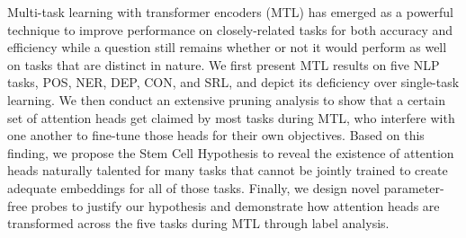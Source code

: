 Multi-task learning with transformer encoders (MTL) has emerged as a powerful technique to improve performance on closely-related tasks for both accuracy and efficiency while a question still remains whether or not it would perform as well on tasks that are distinct in nature. We first present MTL results on five NLP tasks, POS, NER, DEP, CON, and SRL, and depict its deficiency over single-task learning. We then conduct an extensive pruning analysis to show that a certain set of attention heads get claimed by most tasks during MTL, who interfere with one another to fine-tune those heads for their own objectives. Based on this finding, we propose the Stem Cell Hypothesis to reveal the existence of attention heads naturally talented for many tasks that cannot be jointly trained to create adequate embeddings for all of those tasks. Finally, we design novel parameter-free probes to justify our hypothesis and demonstrate how attention heads are transformed across the five tasks during MTL through label analysis.
